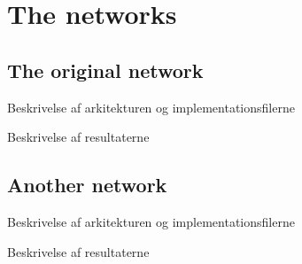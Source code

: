 \graphicspath{{Chapters/Project/}}

\section{The networks} %
\label{sec:the_networks}

\subsection{The original network} %
\label{sub:the_original_network}

Beskrivelse af arkitekturen og implementationsfilerne

Beskrivelse af resultaterne


\subsection{Another network} %
\label{sub:another_network}

Beskrivelse af arkitekturen og implementationsfilerne

Beskrivelse af resultaterne


